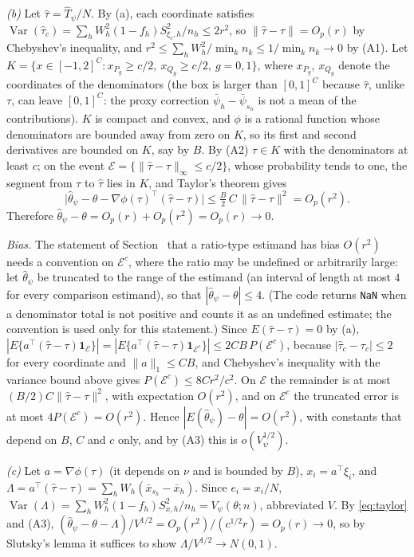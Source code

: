 \emph{(b)} Let $\hat\tau=\hat T_\psi/N$. By (a), each coordinate satisfies
$\operatorname{Var}(\hat\tau_c)=\sum_hW_h^2(1-f_h)S^2_{\xi_c,h}/n_h\le2r^2$, so
$\|\hat\tau-\tau\|=O_p(r)$ by Chebyshev's inequality, and $r^2\le\sum_hW_h^2/\min_kn_k\le
1/\min_kn_k\to0$ by (A1). Let $K=\{x\in[-1,2]^C:x_{P_g}\ge c/2,\ x_{Q_g}\ge c/2,\ g=0,1\}$, where
$x_{P_g}$, $x_{Q_g}$ denote the coordinates of the denominators (the box is larger than $[0,1]^C$ because
$\hat\tau$, unlike $\tau$, can leave $[0,1]^C$: the proxy correction $\bar\psi_h-\bar\psi_{s_h}$ is not a mean of the contributions). $K$ is compact and convex, and
$\phi$ is a rational function whose denominators are bounded away from zero on $K$, so its first
and second derivatives are bounded on $K$, say by $B$. By (A2) $\tau\in K$ with the denominators at
least $c$; on the event $\mathcal E=\{\|\hat\tau-\tau\|_\infty\le c/2\}$, whose probability tends to
one, the segment from $\tau$ to $\hat\tau$ lies in $K$, and Taylor's theorem gives
\begin{equation}\label{eq:taylor}
\big|\hat\theta_\psi-\theta-\nabla\phi(\tau)^\top(\hat\tau-\tau)\big|\le\tfrac{B}{2}\,C\,\|\hat\tau-\tau\|^2=O_p(r^2).
\end{equation}
Therefore $\hat\theta_\psi-\theta=O_p(r)+O_p(r^2)=O_p(r)\to0$.

\emph{Bias.} The statement of Section~ that a ratio-type estimand has bias $O(r^2)$ needs a convention on $\mathcal E^c$, where the ratio may be undefined or
arbitrarily large: let $\hat\theta_\psi$ be truncated to the range of the estimand (an interval of length at most $4$ for every comparison estimand), so that $|\hat\theta_\psi-\theta|\le4$. (The code returns \texttt{NaN} when a
denominator total is not positive and counts it as an undefined estimate; the convention is used only for this statement.) Since $E(\hat\tau-\tau)=0$ by (a),
$|E\{a^\top(\hat\tau-\tau)\mathbf 1_{\mathcal E}\}|=|E\{a^\top(\hat\tau-\tau)\mathbf 1_{\mathcal E^c}\}|\le2CB\,P(\mathcal E^c)$, because $|\hat\tau_c-\tau_c|\le2$ for every coordinate and $\|a\|_1\le CB$,
and Chebyshev's inequality with the variance bound above gives $P(\mathcal E^c)\le8Cr^2/c^2$. On $\mathcal E$ the remainder is at most $(B/2)C\|\hat\tau-\tau\|^2$, with expectation $O(r^2)$, and on $\mathcal E^c$ the
truncated error is at most $4P(\mathcal E^c)=O(r^2)$. Hence $|E(\hat\theta_\psi)-\theta|=O(r^2)$, with constants that depend on $B$, $C$ and $c$ only, and by (A3) this is $o(V_\psi^{1/2})$.

\emph{(c)} Let $a=\nabla\phi(\tau)$ (it depends on $\nu$ and is bounded by $B$), $x_i=a^\top\xi_i$,
and $\Lambda=a^\top(\hat\tau-\tau)=\sum_hW_h(\bar x_{s_h}-\bar x_h)$. Since $e_i=x_i/N$,
$\operatorname{Var}(\Lambda)=\sum_hW_h^2(1-f_h)S^2_{x,h}/n_h=V_\psi(\theta;n)$, abbreviated $V$. By
\eqref{eq:taylor} and (A3), $(\hat\theta_\psi-\theta-\Lambda)/V^{1/2}=O_p(r^2)/(c^{1/2}r)=O_p(r)\to0$,
so by Slutsky's lemma it suffices to show $\Lambda/V^{1/2}\to N(0,1)$.

